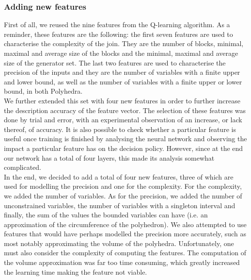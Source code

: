 \subsubsection{Adding new features}
First of all, we reused the nine features from the Q-learning algorithm. As a reminder, these features are the following: the first seven features are used to characterise the complexity of the join. They are the number of blocks, minimal, maximal and average size of the blocks and the minimal, maximal and average size of the generator set. The last two features are used to characterise the precision of the inputs and they are the number of variables with a finite upper and lower bound, as well as the number of variables with a finite upper or lower bound, in both Polyhedra.\\
We further extended this set with four new features in order to further increase the description accuracy of the feature vector. The selection of these features was done by trial and error, with an experimental observation of an increase, or lack thereof, of accuracy. It is also possible to check whether a particular feature is useful once training is finished by analysing the neural network and observing the impact a particular feature has on the decision policy. However, since at the end our network has a total of four layers, this made its analysis somewhat complicated.\\
In the end, we decided to add a total of four new features, three of which are used for modelling the precision and one for the complexity. For the complexity, we added the number of variables. As for the precision, we added the number of unconstrained variables, the number of variables with a singleton interval and finally, the sum of the values the bounded variables can have (i.e. an approximation of the circumference of the polyhedron). We also attempted to use features that would have perhaps modelled the precision more accurately, such as most notably approximating the volume of the polyhedra. Unfortunately, one must also consider the complexity of computing the features. The computation of the volume approximation was far too time consuming, which greatly increased the learning time making the feature not viable.

